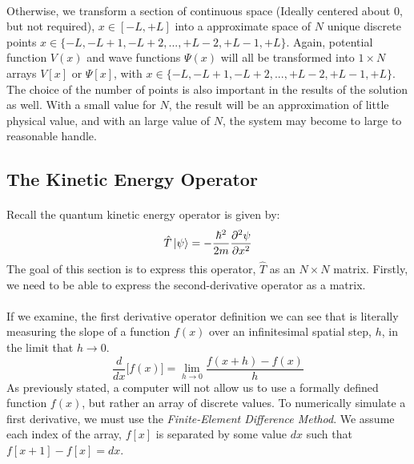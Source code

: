 \documentclass[12pt,letterpaper]{book}
\begin{document}
\paragraph*{}Otherwise, we transform a section of continuous space (Ideally centered about $0$, but not required), $x \in [-L , +L]$ into a approximate space of $N$ unique discrete points $x \in \{-L , -L+1, -L+2 , ... , +L-2 , +L-1, +L\}$. Again, potential function $V(x)$ and wave functions $\Psi(x)$ will all be transformed into $1 \times N$ arrays $V[x]$ or $\Psi[x]$, with $x \in \{-L , -L+1, -L+2 , ... , +L-2 , +L-1, +L\}$. The choice of the number of points is also important in the results of the solution as well. With a small value for $N$, the result will be an approximation of little physical value, and with an large value of $N$, the system may become to large to reasonable handle.


\subsection{The Kinetic Energy Operator}

\paragraph*{}Recall the quantum kinetic energy operator is given by:
\begin{equation}
\label{KE}
\hat{T}\ket{\psi} = -\frac{\hbar^2}{2m}\frac{\partial^2 \psi}{\partial x^2}
\end{equation}
The goal of this section is to express this operator, $\hat{T}$ as an $N \times N$ matrix. Firstly, we need to be able to express the second-derivative operator as a matrix. 

\paragraph*{}If we examine, the first derivative operator definition we can see that is literally measuring the slope of a function $f(x)$ over an infinitesimal spatial step, $h$, in the limit that $h \rightarrow 0$.
\begin{equation}
\frac{d}{dx}\Big[ f(x) \Big] = \lim_{h \rightarrow 0} \frac{f(x + h) - f(x)}{h}
\end{equation}
As previously stated, a computer will not allow us to use a formally defined function $f(x)$, but rather an array of discrete values. To numerically simulate a first derivative, we must use the \textit{Finite-Element Difference Method}. We assume each index of the array, $f[x]$ is separated by some value $dx$ such that $f[x+1] - f[x] = dx$. 
\end{document}
